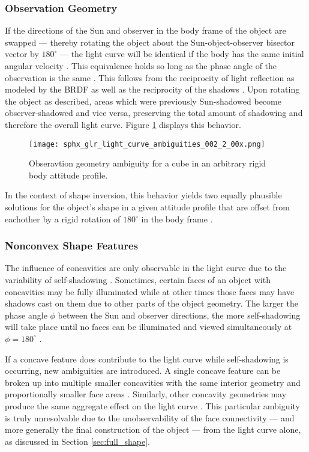 \subsubsection{Observation Geometry}

If the directions of the Sun and observer in the body frame of the object are swapped --- thereby rotating the object about the Sun-object-observer bisector vector by $180^\circ$ --- the light curve will be identical if the body has the same initial angular velocity \cite{burton2023attitude}. This equivalence holds so long as the phase angle of the observation is the same \cite{burton2023attitude}. This follows from the reciprocity of light reflection as modeled by the BRDF as well as the reciprocity of the shadows \cite{burton2023attitude}. Upon rotating the object as described, areas which were previously Sun-shadowed become observer-shadowed and vice versa, preserving the total amount of shadowing and therefore the overall light curve. Figure \ref{fig:obs_amg} displays this behavior.

\begin{figure}[!htb]
  \centering
  \texttt{[image: sphx\_glr\_light\_curve\_ambiguities\_002\_2\_00x.png]}
  \caption{Obseravtion geometry ambiguity for a cube in an arbitrary rigid body attitude profile.}
  \label{fig:obs_amg}
\end{figure}

In the context of shape inversion, this behavior yields two equally plausible solutions for the object's shape in a given attitude profile that are offset from eachother by a rigid rotation of $180^\circ$ in the body frame \cite{burton2023attitude}. 

\subsubsection{Nonconvex Shape Features}

The influence of concavities are only observable in the light curve due to the variability of self-shadowing \cite{durech2003}. Sometimes, certain faces of an object with concavities may be fully illuminated while at other times those faces may have shadows cast on them due to other parts of the object geometry. The larger the phase angle $\phi$ between the Sun and observer directions, the more self-shadowing will take place until no faces can be illuminated and viewed simultaneously at $\phi=180^\circ$ \cite{durech2003}.

If a concave feature does contribute to the light curve while self-shadowing is occurring, new ambiguities are introduced. A single concave feature can be broken up into multiple smaller concavities with the same interior geometry and proportionally smaller face areas \cite{durech2003}. Similarly, other concavity geometries may produce the same aggregate effect on the light curve \cite{durech2003}. This particular ambiguity is truly unresolvable due to the unobservability of the face connectivity --- and more generally the final construction of the object --- from the light curve alone, as discussed in Section \ref{sec:full_shape}.

